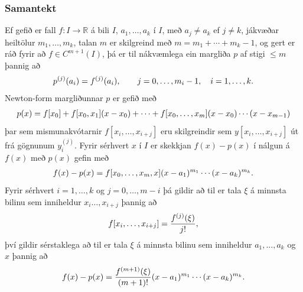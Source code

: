 \documentclass[a4paper,10pt,icelandic]{sphinxmanual}
\begin{document}
\subsubsection{Samantekt}
\label{kafli03:id9}
Ef gefið er fall \(f:I\to {{\mathbb  R}}\) á bili \(I\),
\(a_1,\dots,a_k\) í \(I\), með \(a_j\neq a_k\) ef
\(j\neq k\), jákvæðar heiltölur \(m_1,\dots,m_k\), talan
\(m\) er skilgreind með \(m=m_1+\cdots+m_k-1\), og gert er ráð
fyrir að \(f\in C^{m+1}(I)\), þá er til nákvæmlega ein margliða
\(p\) af stigi \(\leq m\) þannig að
\begin{gather}
\begin{split}p^{(j)}(a_i)=f^{(j)}(a_i), \qquad j=0,\dots, m_i-1, \quad i=1,\dots,k.\end{split}\notag
\end{gather}
Newton-form margliðunnar \(p\) er gefið með
\begin{gather}
\begin{split}p(x)=f[x_0]+f[x_0,x_1](x-x_0)+\cdots+f[x_0,\dots,x_m](x-x_0)\cdots(x-x_{m-1})\end{split}\notag
\end{gather}
þar sem mismunakvótarnir \(f[x_i,\dots,x_{i+j}]\) eru skilgreindir
sem \(y[x_i,\dots,x_{i+j}]\) út frá gögnunum \(y^{(j)}_i\).
Fyrir sérhvert \(x\) í \(I\) er skekkjan \(f(x)-p(x)\) í
nálgun á \(f(x)\) með \(p(x)\) gefin með
\begin{gather}
\begin{split}f(x)-p(x)=f[x_0,\dots,x_m,x](x-a_1)^{m_1}\cdots(x-a_k)^{m_k}.\end{split}\notag
\end{gather}
Fyrir sérhvert \(i=1,\dots,k\) og \(j=0,\dots,m-i\) þá gildir að
til er tala \(\xi\) á minnsta bilinu sem inniheldur
\(x_i\dots,x_{i+j}\) þannig að
\begin{gather}
\begin{split}f[x_i,\dots,x_{i+j}]=\dfrac{f^{(j)}(\xi)}{j!},\end{split}\notag
\end{gather}
því gildir sérstaklega að til er tala \(\xi\) á minnsta bilinu sem
inniheldur \(a_1,\dots,a_k\) og \(x\) þannig að
\begin{gather}
\begin{split}f(x)-p(x)=\dfrac{f^{(m+1)}(\xi)}{(m+1)!}(x-a_1)^{m_1}\cdots(x-a_k)^{m_k}.\end{split}\notag
\end{gather}
\end{document}
